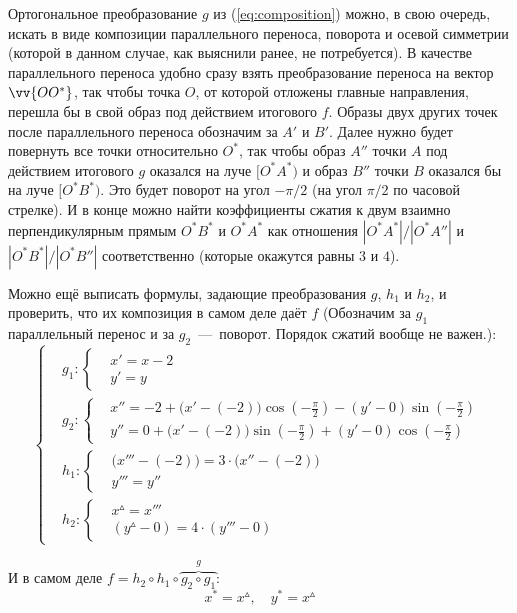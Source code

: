 \documentclass[a4paper,12pt]{article}
\begin{document}
\begin{solution}
    Ортогональное преобразование $g$ из (\ref{eq:composition}) можно, в свою очередь, искать в виде композиции параллельного переноса, поворота и осевой симметрии (которой в данном случае, как выяснили ранее, не потребуется).
    В качестве параллельного переноса удобно сразу взять преобразование переноса на вектор $\vv{OO^*}$, так чтобы точка $O$, от которой отложены главные направления, перешла бы в свой образ под действием итогового $f$.
    Образы двух других точек после параллельного переноса обозначим за $A'$ и $B'$.
    Далее нужно будет повернуть все точки относительно $O^*$, так чтобы образ $A''$ точки $A$ под действием итогового $g$ оказался на луче $[O^*A^*)$ и образ $B''$ точки $B$ оказался бы на луче $[O^*B^*)$.
    Это будет поворот на угол $-\pi/2$ (на угол $\pi/2$ по часовой стрелке).
    И в конце можно найти коэффициенты сжатия к двум взаимно перпендикулярным прямым $O^*B^*$ и $O^*A^*$ как отношения $|O^*A^*|/|O^*A''|$ и $|O^*B^*|/|O^*B''|$ соответственно (которые окажутся равны $3$ и $4$).
    
    Можно ещё выписать формулы, задающие преобразования $g$, $h_1$ и $h_2$, и проверить, что их композиция в самом деле даёт $f$ (Обозначим за $g_1$ параллельный перенос и за $g_2$~---~поворот. Порядок сжатий вообще не важен.):
    \[
      \left\{
        \begin{aligned}
          &g_1\colon \left\{
            \begin{aligned}
              &x' = x - 2\\
              &y' = y
            \end{aligned}
          \right.\\
          &g_2\colon \left\{
            \begin{aligned}
              &x{''} = -2 + \bigl(x' - (-2)\bigr)\cos{\left(-\frac{\pi}{2}\right)} - (y' - 0)\sin{\left(-\frac{\pi}{2}\right)}\\
              &y{''} = 0 + \bigl(x' - (-2)\bigr)\sin{\left(-\frac{\pi}{2}\right)} + (y' - 0)\cos{\left(-\frac{\pi}{2}\right)}
            \end{aligned}
          \right.\\
          &h_1\colon \left\{
            \begin{aligned}
              &\bigl(x{'''} - (-2)\bigr)= 3 \cdot \bigl(x{''} - (-2)\bigr)\\
              &y{'''} = y{''}
            \end{aligned}
          \right.\\
          &h_2\colon \left\{
            \begin{aligned}
              &x^{\vartriangle} = x{'''}\\
              &(y^{\vartriangle} - 0) = 4 \cdot (y{'''} - 0)
            \end{aligned}
          \right.
        \end{aligned}
      \right.
    \]
    
    И в самом деле $f = h_2 \circ h_1 \circ \overbrace{g_2 \circ g_1}^g$:
    \[
      x^* = x^{\vartriangle},\quad y^* = x^{\vartriangle}
    \]
  \end{solution}
  
\end{document}
